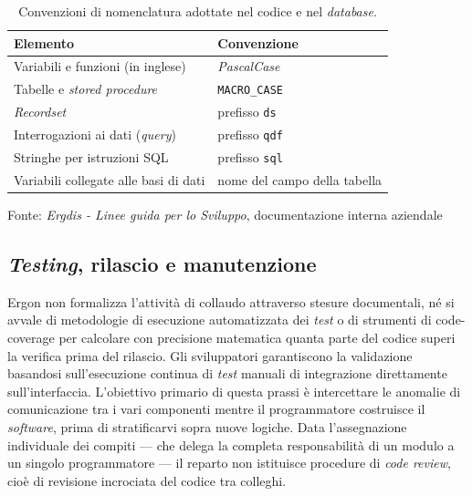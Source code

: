 \begin{table}[H]
    \centering
    \begin{tabular}{ll}
        \hline
        \textbf{Elemento} & \textbf{Convenzione} \\
        \hline
        Variabili e funzioni (in inglese) & \textit{PascalCase} \\
        Tabelle e \textit{stored procedure} & \texttt{MACRO\_CASE} \\
        \textit{Recordset} & prefisso \texttt{ds} \\
        Interrogazioni ai dati (\textit{query}) & prefisso \texttt{qdf} \\
        Stringhe per istruzioni SQL & prefisso \texttt{sql} \\
        Variabili collegate alle basi di dati & nome del campo della tabella \\
        \hline
    \end{tabular}
    \caption{Convenzioni di nomenclatura adottate nel codice e nel \textit{database}.}
    \vspace{0.1cm}
    {\footnotesize Fonte: \textit{Ergdis - Linee guida per lo Sviluppo}, documentazione interna aziendale\par}
    \label{tab:convenzioni_nomenclatura}
\end{table}

\subsection{\textit{Testing}, rilascio e manutenzione}

Ergon non formalizza l'attività di collaudo attraverso stesure documentali, né si avvale di metodologie di esecuzione automatizzata dei \textit{test} o di strumenti di \gls{code-coverage} per calcolare con precisione matematica quanta parte del codice superi la verifica prima del rilascio. Gli sviluppatori garantiscono la validazione basandosi sull'esecuzione continua di \textit{test} manuali di integrazione direttamente sull'interfaccia. L'obiettivo primario di questa prassi è intercettare le anomalie di comunicazione tra i vari componenti mentre il programmatore costruisce il \textit{software}, prima di stratificarvi sopra nuove logiche. Data l'assegnazione individuale dei compiti --- che delega la completa responsabilità di un modulo a un singolo programmatore --- il reparto non istituisce procedure di \textit{code review}, cioè di revisione incrociata del codice tra colleghi.

